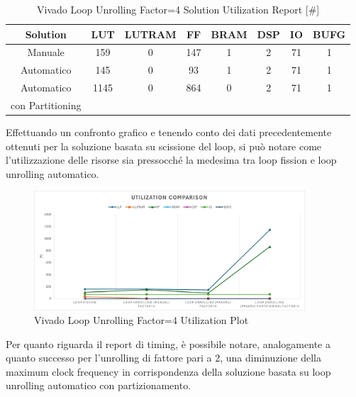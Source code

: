 \begin{table}[H]
    \centering
    \begin{tabular}{|c|c|c|c|c|c|c|c|}
        \hline
        \textbf{Solution} & \textbf{LUT} & \textbf{LUTRAM} & \textbf{FF} & \textbf{BRAM} & \textbf{DSP} & \textbf{IO} & \textbf{BUFG} \\
        \hline
        Manuale & 159 & 0 & 147 & 1 & 2 & 71 & 1 \\
        \hline
        Automatico & 145 & 0 & 93 & 1 & 2 & 71 & 1 \\
        \hline
        Automatico & 1145 & 0 & 864 & 0 & 2 & 71 & 1 \\
        con Partitioning & & & & & & & \\
        \hline
    \end{tabular}
    \caption{Vivado Loop Unrolling Factor=4 Solution Utilization Report [\#]}
    \label{tab:vivado-loop-unrolling-factor4-utilization-report}
\end{table}

Effettuando un confronto grafico e tenendo conto dei dati precedentemente ottenuti per la soluzione basata su scissione del loop, si può notare come l'utilizzazione delle risorse sia pressocché la medesima tra loop fission e loop unrolling automatico.

\begin{figure}[H]
    \centering
    \includegraphics[width=0.9\textwidth]{solutions/loop_unrolling/factor4/loopunrollingfactor4utilization.png}
    \caption{Vivado Loop Unrolling Factor=4 Utilization Plot}
    \label{fig:vivado-loop-unrolling-factor4-utilization-plot}
\end{figure}

Per quanto riguarda il report di timing, è possibile notare, analogamente a quanto successo per l'unrolling di fattore pari a 2, una diminuzione della maximum clock frequency in corrispondenza della soluzione basata su loop unrolling automatico con partizionamento.

